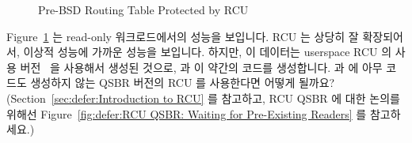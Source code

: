 \begin{figure}[tb]
\centering
{}
\caption{Pre-BSD Routing Table Protected by RCU}
\label{fig:defer:Pre-BSD Routing Table Protected by RCU}
\end{figure}

Figure~\ref{fig:defer:Pre-BSD Routing Table Protected by RCU}
는 read-only 워크로드에서의 성능을 보입니다.
RCU 는 상당히 잘 확장되어서, 이상적 성능에 가까운 성능을 보입니다.
하지만, 이 데이터는 userspace RCU 의  사용
버전~\cite{MathieuDesnoyers2009URCU,PaulMcKenney2013LWNURCU} 을 사용해서 생성된
것으로,  과  이 약간의 코드를
생성합니다.
 과  에 아무 코드도 생성하지 않는
QSBR 버전의 RCU 를 사용한다면 어떻게
될까요?
(Section~\ref{sec:defer:Introduction to RCU} 를 참고하고, RCU QSBR 에 대한
논의를 위해선
Figure~\ref{fig:defer:RCU QSBR: Waiting for Pre-Existing Readers} 를
참고하세요.)

